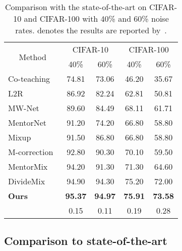 \documentclass[final]{cvpr}
\begin{document}
\begin{table}[t]
	\centering
	\small
	\begin{tabular}{|lr|cc|cc|}
		\hline
		\multicolumn{2}{|c|}{\multirow{2}{*}{Method}}  & \multicolumn{2}{|c|}{CIFAR-10} & \multicolumn{2}{|c|}{CIFAR-100} \\
		\cline{3-6}
		      &  & 40\% & 60\% & 40\% & 60\% \\
		\hline

        \multicolumn{2}{|l|}{Co-teaching~\cite{han2018co}} & 74.81 & 73.06 & 46.20 & 35.67 \\  
        \hline
        \multicolumn{2}{|l|}{L2R~\cite{ren2018learning}}& 86.92 & 82.24 & 62.81 & 50.81 \\
        \hline
        \multicolumn{2}{|l|}{MW-Net~\cite{shu2019meta}} & 89.60 & 84.49 & 68.11 & 61.71 \\
        \hline
        \multicolumn{2}{|l|}{MentorNet~\cite{jiang2017mentornet}} & 91.20 & 74.20 & 66.80 & 58.80 \\
        \hline
        \multicolumn{2}{|l|}{Mixup~\cite{zhang2017mixup}} & 91.50 & 86.80 & 66.80 & 58.80 \\
        \hline
\multicolumn{2}{|l|}{M-correction~\cite{arazo2019unsupervised}} & 92.80 & 90.30 & 70.10 & 59.50 \\
        \hline
\multicolumn{2}{|l|}{MentorMix~\cite{jiang2020beyond}} & 94.20 & 91.30 & 71.30 & 64.60 \\
        \hline
\multicolumn{2}{|l|}{DivideMix~\cite{li2020dividemix}} & 94.90 & 94.30 & 75.20 & 72.00 \\
		\hline\hline
        \multicolumn{2}{|l|}{\textbf{Ours}} &  \textbf{95.37} & \textbf{94.97} & \textbf{75.91} & \textbf{73.58}  \\
                   &   &  {\footnotesize 0.15} & {\footnotesize 0.11} & {\footnotesize 0.19} & {\footnotesize 0.28}  \\
		\hline
	\end{tabular}
	\vspace{-1mm}
	\caption{Comparison with the state-of-the-art on CIFAR-10 and CIFAR-100 with 40\% and 60\% noise rates.  denotes the results are reported by~\cite{jiang2020beyond}.}
	\label{tab:cifar_mwn}
	\vspace{-5mm}
\end{table}
 

\subsection{Comparison to state-of-the-art}\label{sec:exp_sota_noisy}
\end{document}
